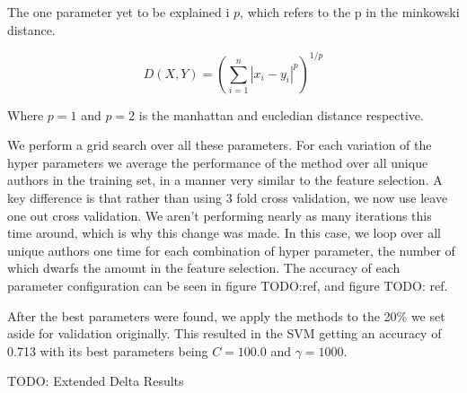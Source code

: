 The one parameter yet to be explained i $p$, which refers to the p in the
minkowski distance.

$$
D(X,Y) = \left(\sum_{i = 1}^n |x_i - y_i|^p\right)^{1/p}
$$

Where $p=1$ and $p=2$ is the manhattan and eucledian distance respective.

We perform a grid search over all these parameters. For each variation of the
hyper parameters we average the performance of the method over all unique
authors in the training set, in a manner very similar to the feature selection.
A key difference is that rather than using 3 fold cross validation, we now use
leave one out cross validation. We aren't performing nearly as many iterations
this time around, which is why this change was made. In this case, we loop
over all unique authors one time for each combination of hyper parameter, the
number of which dwarfs the amount in the feature selection. The accuracy of each
parameter configuration can be seen in figure TODO:ref, and figure TODO: ref.

After the best parameters were found, we apply the methods to the 20\% we set
aside for validation originally. This resulted in the SVM getting an accuracy of
0.713 with its best parameters being $C=100.0$ and $\gamma=1000$.

TODO: Extended Delta Results

